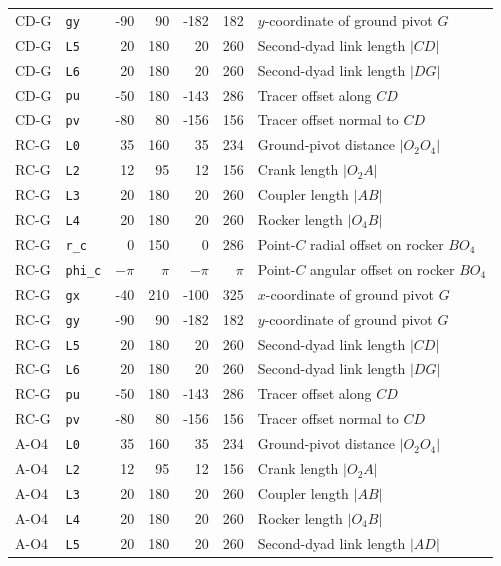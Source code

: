 \begin{longtable}{@{}llrrrrp{4.3cm}@{}}
CD-G & \texttt{gy} & -90 & 90 & -182 & 182 & $y$-coordinate of ground pivot $G$ \\
CD-G & \texttt{L5} & 20 & 180 & 20 & 260 & Second-dyad link length $|CD|$ \\
CD-G & \texttt{L6} & 20 & 180 & 20 & 260 & Second-dyad link length $|DG|$ \\
CD-G & \texttt{pu} & -50 & 180 & -143 & 286 & Tracer offset along $CD$ \\
CD-G & \texttt{pv} & -80 & 80 & -156 & 156 & Tracer offset normal to $CD$ \\
\addlinespace
RC-G & \texttt{L0} & 35 & 160 & 35 & 234 & Ground-pivot distance $|O_2O_4|$ \\
RC-G & \texttt{L2} & 12 & 95 & 12 & 156 & Crank length $|O_2A|$ \\
RC-G & \texttt{L3} & 20 & 180 & 20 & 260 & Coupler length $|AB|$ \\
RC-G & \texttt{L4} & 20 & 180 & 20 & 260 & Rocker length $|O_4B|$ \\
RC-G & \texttt{r\_c} & 0 & 150 & 0 & 286 & Point-$C$ radial offset on rocker $BO_4$ \\
RC-G & \texttt{phi\_c} & $-\pi$ & $\pi$ & $-\pi$ & $\pi$ & Point-$C$ angular offset on rocker $BO_4$ \\
RC-G & \texttt{gx} & -40 & 210 & -100 & 325 & $x$-coordinate of ground pivot $G$ \\
RC-G & \texttt{gy} & -90 & 90 & -182 & 182 & $y$-coordinate of ground pivot $G$ \\
RC-G & \texttt{L5} & 20 & 180 & 20 & 260 & Second-dyad link length $|CD|$ \\
RC-G & \texttt{L6} & 20 & 180 & 20 & 260 & Second-dyad link length $|DG|$ \\
RC-G & \texttt{pu} & -50 & 180 & -143 & 286 & Tracer offset along $CD$ \\
RC-G & \texttt{pv} & -80 & 80 & -156 & 156 & Tracer offset normal to $CD$ \\
\addlinespace
A-O4 & \texttt{L0} & 35 & 160 & 35 & 234 & Ground-pivot distance $|O_2O_4|$ \\
A-O4 & \texttt{L2} & 12 & 95 & 12 & 156 & Crank length $|O_2A|$ \\
A-O4 & \texttt{L3} & 20 & 180 & 20 & 260 & Coupler length $|AB|$ \\
A-O4 & \texttt{L4} & 20 & 180 & 20 & 260 & Rocker length $|O_4B|$ \\
A-O4 & \texttt{L5} & 20 & 180 & 20 & 260 & Second-dyad link length $|AD|$ \\

\end{longtable}

